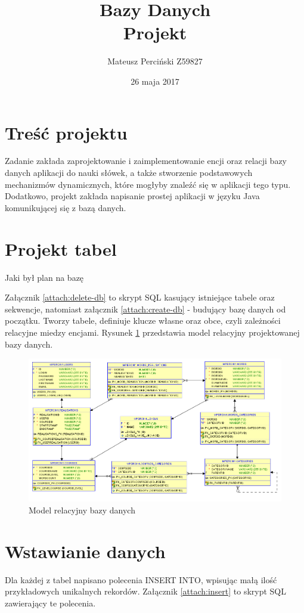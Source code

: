 \documentclass[11pt,a4paper]{article}
\title{Bazy Danych\\\large \medskip Projekt\\}
\author{Mateusz Perciński Z59827}
\date{26 maja 2017}
\begin{document}
\maketitle
\tableofcontents

\section*{Treść projektu}
Zadanie zakłada zaprojektowanie i zaimplementowanie encji oraz relacji bazy danych aplikacji do nauki słówek, a także stworzenie podstawowych mechanizmów dynamicznych, które mogłyby znaleźć się w aplikacji tego typu. Dodatkowo, projekt zakłada napisanie prostej aplikacji w języku Java komunikującej się z bazą danych. 

\section{Projekt tabel}
Jaki był plan na bazę %

Załącznik \ref{attach:delete-db} to skrypt SQL kasujący istniejące tabele oraz sekwencje, natomiast załącznik \ref{attach:create-db} - budujący bazę danych od początku. Tworzy tabele, definiuje klucze własne oraz obce, czyli zależności relacyjne miedzy encjami. Rysunek \ref{fig:model} przedstawia model relacyjny projektowanej bazy danych.

\begin{figure}[ht!]
\includegraphics[width=\textwidth]{graphics/relational-model}
\caption{Model relacyjny bazy danych}
\label{fig:model}
\end{figure}

\section{Wstawianie danych}
Dla każdej z tabel napisano polecenia INSERT INTO, wpisując małą ilość przykładowych unikalnych rekordów. Załącznik \ref{attach:insert} to skrypt SQL zawierający te polecenia.
\end{document}
